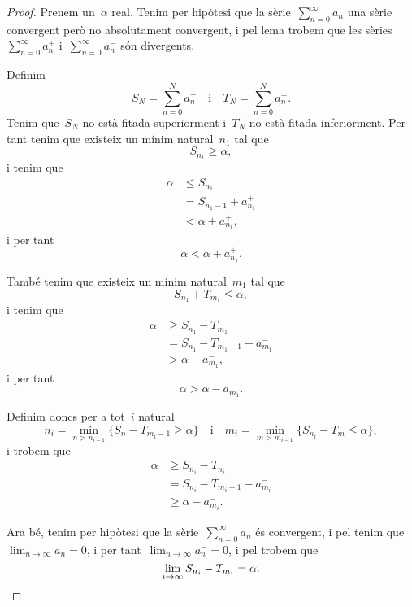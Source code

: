 \documentclass[../analisi-matematica.tex]{subfiles}
\begin{document}
    \begin{proof}
        Prenem un~\(\alpha\) real.
        Tenim per hipòtesi que la sèrie~\(\sum_{n=0}^{\infty}a_{n}\) una sèrie convergent però no absolutament convergent, i pel lema  trobem que les sèries~\(\sum_{n=0}^{\infty}a^{+}_{n}\) i~\(\sum_{n=0}^{\infty}a^{-}_{n}\) són divergents.

        Definim
        \[
            S_{N}=\sum_{n=0}^{N}a^{+}_{n}\quad\text{i}\quad T_{N}=\sum_{n=0}^{N}a^{-}_{n}.
        \]
        Tenim que~\(S_{N}\) no està fitada superiorment i~\(T_{N}\) no està fitada inferiorment.
        Per tant tenim que existeix un mínim natural~\(n_{1}\) tal que
        \[
            S_{n_{1}}\geq\alpha,
        \]
        i tenim que
        \begin{align*}
            \alpha&\leq S_{n_{1}} \\
            &=S_{n_{1}-1}+a^{+}_{n_{1}} \\
            &<\alpha+a^{+}_{n_{1}},
        \end{align*}
        i per tant
        \[
            \alpha<\alpha+a^{+}_{n_{1}}.
        \]

        També tenim que existeix un mínim natural~\(m_{1}\) tal que
        \[
            S_{n_{1}}+T_{m_{1}}\leq\alpha,
        \]
        i tenim que
        \begin{align*}
            \alpha&\geq S_{n_{1}}-T_{m_{1}} \\
            &=S_{n_{1}}-T_{m_{1}-1}-a^{-}_{m_{1}} \\
            &>\alpha-a^{-}_{m_{1}},
        \end{align*}
        i per tant
        \[
            \alpha>\alpha-a^{-}_{m_{1}}.
        \]

        Definim doncs per a tot~\(i\) natural
        \[
            n_{i}=\min_{n>n_{i-1}}\{S_{n}-T_{m_{i}-1}\geq\alpha\}\quad\text{i}\quad m_{i}=\min_{m>m_{i-1}}\{S_{n_{i}}-T_{m}\leq\alpha\},
        \]
        i trobem que
        \begin{align*}
            \alpha&\geq S_{n_{i}}-T_{n_{i}} \\
            &=S_{n_{i}}-T_{m_{i}-1}-a^{-}_{m_{i}} \\
            &\geq\alpha-a^{-}_{m_{i}}.
        \end{align*}

        Ara bé, tenim per hipòtesi que la sèrie~\(\sum_{n=0}^{\infty}a_{n}\) és convergent, i pel \corollari{}  tenim que~\(\lim_{n\to\infty}a_{n}=0\), i per tant~\(\lim_{n\to\infty}a^{-}_{n}=0\), i pel  trobem que
        \[
            \lim_{i\to\infty}S_{n_{i}}-T_{m_{i}}=\alpha.\qedhere
        \]
    \end{proof}
\end{document}
